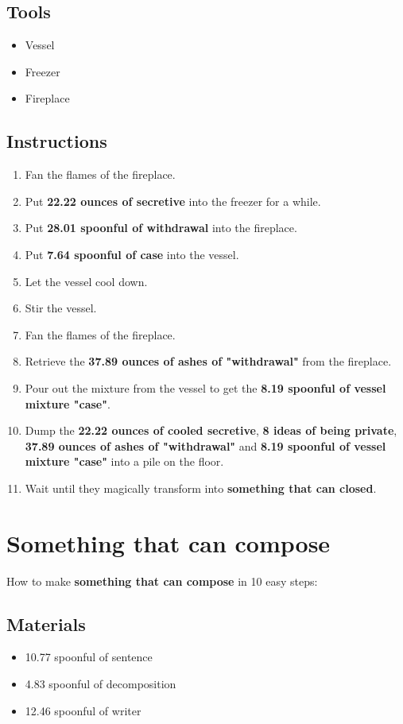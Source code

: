 \documentclass{article}
\begin{document}
\subsection{Tools}\begin{itemize}
\item 
Vessel
\item 
Freezer
\item 
Fireplace
\end{itemize}
\subsection{Instructions}\begin{enumerate}
\item 
Fan the flames of the fireplace.
\item 
Put \textbf{22.22 ounces of secretive} into the freezer for a while.
\item 
Put \textbf{28.01 spoonful of withdrawal} into the fireplace.
\item 
Put \textbf{7.64 spoonful of case} into the vessel.
\item 
Let the vessel cool down.
\item 
Stir the vessel.
\item 
Fan the flames of the fireplace.
\item 
Retrieve the \textbf{37.89 ounces of ashes of "withdrawal"} from the fireplace.
\item 
Pour out the mixture from the vessel to get the \textbf{8.19 spoonful of vessel mixture "case"}.
\item 
Dump the \textbf{22.22 ounces of cooled secretive}, \textbf{8 ideas of being private}, \textbf{37.89 ounces of ashes of "withdrawal"} and \textbf{8.19 spoonful of vessel mixture "case"} into a pile on the floor.
\item 
Wait until they magically transform into \textbf{something that can closed}.
\end{enumerate}
\newpage
\section{Something that can compose}How to make \textbf{something that can compose} in 10 easy steps:

\subsection{Materials}\begin{itemize}
\item 
10.77 spoonful of sentence
\item 
4.83 spoonful of decomposition
\item 
12.46 spoonful of writer
\end{itemize}
\end{document}
